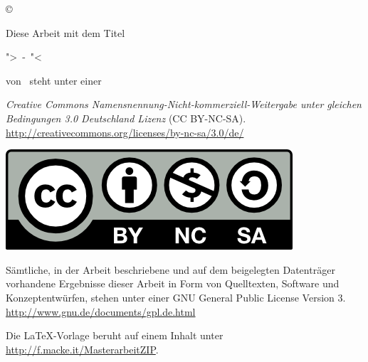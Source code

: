 \clearpage
\vspace*{\fill}



\begin{center}
	\copyright\ \jahr\ \autor \\
	
	\vspace*{15mm}
	
	Diese Arbeit mit dem Titel 
	
	">\titel\ -\ \untertitel"< 
	
	von \autor\ steht unter einer
	
	\textit{Creative Commons Namensnennung-Nicht-kommerziell-Weitergabe unter gleichen Bedingungen 3.0 Deutschland Lizenz} (CC BY-NC-SA). \linebreak
	\url{http://creativecommons.org/licenses/by-nc-sa/3.0/de/}
	
	\includegraphics[scale=0.9]{images/CC_BY-NC-SA}
	
	\vspace*{15mm}
	
	Sämtliche, in der Arbeit beschriebene und auf dem beigelegten Datenträger vorhandene Ergebnisse dieser Arbeit in Form von Quelltexten, Software und Konzeptentwürfen, stehen unter einer GNU General Public License Version 3.\linebreak
	\url{http://www.gnu.de/documents/gpl.de.html}
	
	\vspace*{15mm}
	
	Die LaTeX-Vorlage beruht auf einem Inhalt unter \url{http://f.macke.it/MasterarbeitZIP}.

\end{center}


\vspace*{\fill}
\clearpage